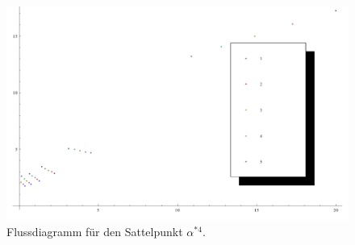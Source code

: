 \begin{figure}
 \centering

 \includegraphics[scale = 0.5]{abschnitte/beta_QCDxdQCD/fig/Fix4_mit_Skalaren.pdf}

 \caption{Flussdiagramm für den Sattelpunkt $\alpha^{*4}$.}
 
 \label{fig:beta_QCDxdQCD:Fix4_mit_Skalaren}

 \end{figure}
